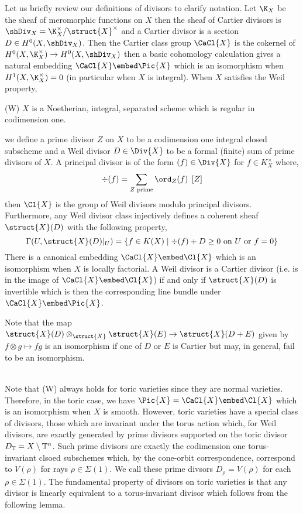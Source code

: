 \documentclass[12pt]{article}
\begin{document}
Let us briefly review our definitions of divisors to clarify notation. Let $\K_X$ be the sheaf of meromorphic functions on $X$ then the sheaf of Cartier divisors is $\shDiv_X = \K_X^\times / \struct{X}^\times$ and a Cartier divisor is a section $D \in H^0(X, \shDiv_X)$. Then the Cartier class group $\CaCl{X}$ is the cokernel of $H^0(X, \K_X^\times) \to H^0(X, \shDiv_X)$ then a basic cohomology calculation gives a natural embedding $\CaCl{X} \embed \Pic{X}$ which is an isomorphism when $H^1(X, \K_X^\times) = 0$ (in particular when $X$ is integral). When $X$ satisfies the Weil property,
\begin{center}
(W) $X$ is a Noetherian, integral, separated scheme which is regular in codimension one. 
\end{center} 
we define a prime divisor $Z$ on $X$ to be a codimension one integral closed subscheme and a Weil divisor $D \in \Div{X}$ to be a formal (finite) sum of prime divisors of $X$. A principal divisor is of the form $(f) \in \Div{X}$ for $f \in K_X^\times$ where,
\[ \div(f) = \sum_{Z \text{ prime}} \ord_{Z}(f) \: \: [Z] \]
then $\Cl{X}$ is the group of Weil divisors modulo principal divisors. Furthermore, any Weil divisor class injectively defines a coherent sheaf $\struct{X}(D)$ with the following property,
\[ \Gamma(U, \struct{X}(D)|_U) = \{ f \in K(X) \mid \div{(f)} + D \ge 0 \text{ on } U \text{ or } f = 0 \} \] 
There is a canonical embedding $\CaCl{X} \embed \Cl{X}$ which is an isomorphism when $X$ is locally factorial. A Weil divisor is a Cartier divisor (i.e. is in the image of $\CaCl{X} \embed \Cl{X}$) if and only if $\struct{X}(D)$ is invertible which is then the corresponding line bundle under $\CaCl{X} \embed \Pic{X}$.
\begin{rmk}
Note that the map $\struct{X}(D) \otimes_{\struct{X}} \struct{X}(E) \to \struct{X}(D + E)$ given by $f \otimes g \mapsto fg$ is an isomorphism if one of $D$ or $E$ is Cartier but may, in general, fail to be an isomorphism. 
\end{rmk}
\noindent\\
Note that (W) always holds for toric varieties since they are normal varieties. Therefore, in the toric case, we have $\Pic{X} = \CaCl{X} \embed \Cl{X}$ which is an isomorphism when $X$ is smooth. However, toric varieties have a special class of divisors, those which are invariant under the torus action which, for Weil divisors, are exactly generated by prime divisors supported on the toric divisor $D_{\mathbb{T}} = X \setminus \mathbb{T}^n$. Such prime divisors are exactly the codimension one torus-invariant clsoed subschemes which, by the cone-orbit correspondence, correspond to $V(\rho)$ for rays $\rho \in \Sigma(1)$. We call these prime divsors $D_\rho = V(\rho)$ for each $\rho \in \Sigma(1)$. The fundamental property of divisors on toric varieties is that any divisor is linearly equivalent to a torus-invariant divisor which follows from the following lemma.
\end{document}
